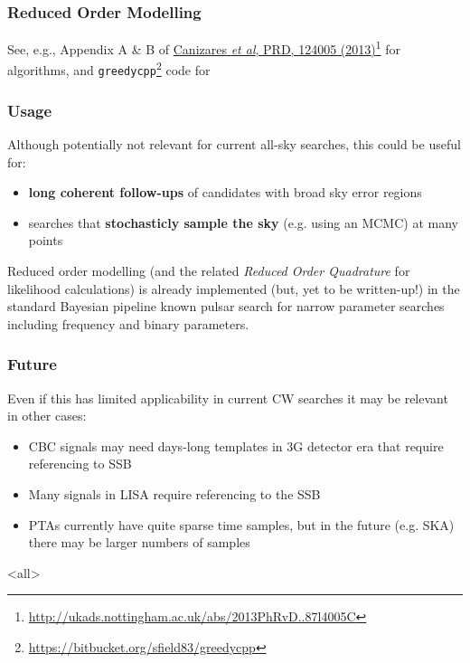 \begin{frame}

\frametitle{Reduced Order Modelling}
\label{reducedordermodelling}

See, e.g., Appendix A \& B of \href{http://ukads.nottingham.ac.uk/abs/2013PhRvD..87l4005C}{Canizares \emph{et al}, PRD, 124005 (2013)}\footnote{\href{http://ukads.nottingham.ac.uk/abs/2013PhRvD..87l4005C}{http:/\slash ukads.nottingham.ac.uk\slash abs\slash 2013PhRvD..87l4005C}} for algorithms, and \texttt{greedycpp}\footnote{ \url{https://bitbucket.org/sfield83/greedycpp} }
code for

\end{frame}

\begin{frame}

\frametitle{Usage}
\label{usage}

Although potentially not relevant for current all-sky searches, this could be useful for:

\begin{itemize}
\item \textbf{long coherent follow-ups} of candidates with broad sky error regions

\item searches that \textbf{stochasticly sample the sky} (e.g. using an MCMC) at many points

\end{itemize}

Reduced order modelling (and the related \emph{Reduced Order Quadrature} for likelihood calculations)
is already implemented (but, yet to be written-up!) in the standard Bayesian pipeline known pulsar search
for narrow parameter searches including frequency and binary parameters.

\end{frame}

\begin{frame}

\frametitle{Future}
\label{future}

Even if this has limited applicability in current CW searches it may be relevant in other cases:

\begin{itemize}
\item CBC signals may need days-long templates in 3G detector era that require referencing to SSB

\item Many signals in LISA require referencing to the SSB

\item PTAs currently have quite sparse time samples, but in the future (e.g. SKA) there may be larger
 numbers of samples

\end{itemize}

\end{frame}

\mode<all>


\mode*

